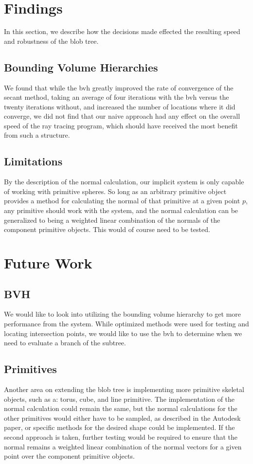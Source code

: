 \documentclass[conference]{acmsiggraph}
\begin{document}
\section{Findings}
In this section, we describe how the decisions made effected the resulting
speed and robustness of the blob tree.

\subsection{Bounding Volume Hierarchies}
We found that while the bvh greatly improved the rate of convergence of the
secant method, taking an average of four iterations with the bvh versus the
twenty iterations without, and increased the number of locations where it did
converge, we did not find that our naive approach had any effect on the overall
speed of the ray tracing program, which should have received the most benefit
from such a structure.

\subsection{Limitations}
By the description of the normal calculation, our implicit system is only
capable of working with primitive spheres. So long as an arbitrary  primitive
object provides a method for calculating the normal of that primitive at a
given point $p$, any primitive should work with the system, and the normal
calculation can be generalized to being a weighted linear combination of the
normals of the component primitive objects. This would of course need to be
tested.

\section{Future Work}
\subsection{BVH}
We would like to look into utilizing the bounding volume hierarchy to get more
performance from the system. While optimized methods were used for testing and
locating intersection points, we would like to use the bvh to determine when we
need to evaluate a branch of the subtree.

\subsection{Primitives}
Another area on extending the blob tree is implementing more primitive skeletal
objects, such as a: torus, cube, and line primitive. The implementation of the
normal calculation could remain the same, but the normal calculations for the
other primitives would either have to be sampled, as described in the Autodesk
paper, or specific methods for the desired shape could be implemented. If the
second approach is taken, further testing would be required to ensure that the
normal remains a weighted linear combination of the normal vectors for a given
point over the component primitive objects.
\end{document}
